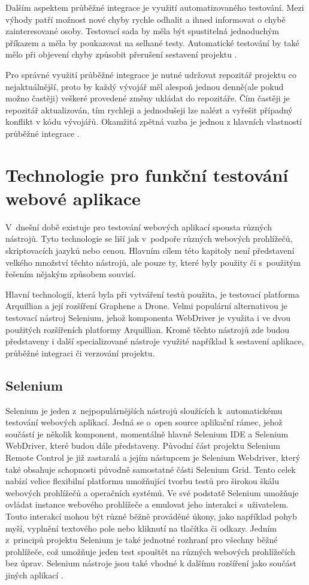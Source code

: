 \documentclass[
    color,   %
	table,   %
    twoside, %
]{fithesis3}
\begin{document}
Dalším aspektem průběžné integrace je využití automatizovaného testování. Mezi výhody patří možnost nové chyby rychle odhalit a ihned informovat o chybě zainteresované osoby. Testovací sada by měla být spustitelná jednoduchým příkazem a měla by poukazovat na selhané testy. Automatické testování by také mělo při objevení chyby způsobit přerušení sestavení projektu \cite{Fowler}.

Pro správné využití průběžné integrace je nutné udržovat repozitář projektu co nejaktuálnější, proto by každý vývojář měl alespoň jednou denně(ale pokud možno častěji) veškeré provedené změny ukládat do repozitáře. Čím častěji je repozitář aktualizován, tím rychleji a jednodušeji lze nalézt a vyřešit případný konflikt v kódu vývojářů. Okamžitá zpětná vazba je jednou z hlavních vlastností průběžné integrace \cite{Fowler}.

\chapter{Technologie pro funkční testování webové aplikace}
V~dnešní době existuje pro testování webových aplikací spousta různých nástrojů. Tyto technologie se liší jak v~podpoře různých webových prohlížečů, skriptovacích jazyků nebo cenou. Hlavním cílem této kapitoly není představení velkého množství těchto nástrojů, ale pouze ty, které byly použity či s~použitým řešením nějakým způsobem souvisí.

Hlavní technologií, která byla při vytváření testů použita, je testovací platforma Arquillian a její rozšíření Graphene a Drone. Velmi populární alternativou je testovací nástroj Selenium, jehož komponenta WebDriver je využita i ve dvou použitých rozšířeních platformy Arquillian. Kromě těchto nástrojů zde budou představeny i další specializované nástroje využité například k sestavení aplikace, průběžné integraci či verzování projektu.

\section{Selenium}
Selenium je jeden z~nejpopulárnějších nástrojů sloužících k~automatickému testování webových aplikací.   Jedná se o~open source aplikační rámec, jehož součástí je několik komponent, momentálně hlavně Selenium IDE a Selenium WebDriver, které budou dále představeny. Původní část projektu Selenium Remote Control je již zastaralá a jejím nástupcem je Selenium Webdriver, který také obsahuje schopnosti původně samostatné části Selenium Grid. Tento celek nabízí velice flexibilní platformu umožňující tvorbu testů pro širokou škálu webových prohlížečů a operačních systémů.
Ve své podstatě Selenium umožňuje ovládat instance webového prohlížeče a emulovat jeho interakci s~uživatelem. Touto interakcí mohou být různé běžně prováděné úkony, jako například pohyb myší, vyplnění textového pole nebo kliknutí na tlačítka či odkazy. Jedním z~principů projektu Selenium je také jednotné rozhraní pro všechny běžné prohlížeče, což umožňuje jeden test spouštět na různých webových prohlížečích bez úprav. Selenium nástroje jsou také vhodné k dalšímu rozšíření jako součást jiných aplikací \cite{SeleniumGithub}.
\end{document}
